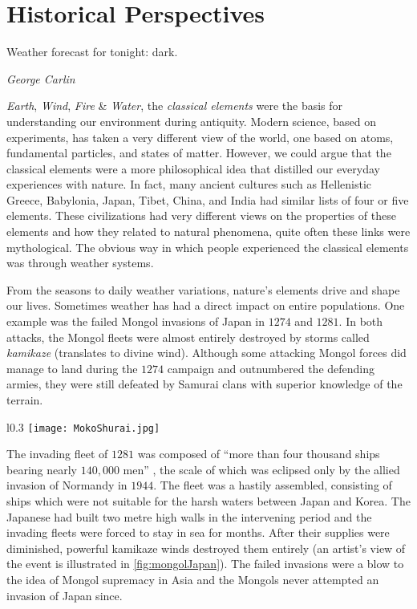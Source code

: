 \chapter{Historical Perspectives}\label{chapter:introduction}

\epigraph{Weather forecast for tonight: dark.}{\textit{George Carlin}}

\emph{Earth}, \emph{Wind}, \emph{Fire} \& \emph{Water}, the \emph{classical elements} were the 
basis for understanding our environment during antiquity. Modern science, based on experiments, has 
taken a very different view of the world, one based on atoms, fundamental particles, and states of 
matter. However, we could argue that the classical elements were a more philosophical idea that 
distilled our everyday experiences with nature. In fact, many ancient cultures such as 
Hellenistic Greece, Babylonia, Japan, Tibet, China, and India had similar lists of four or five 
elements. These civilizations had very different views on the properties of these elements and how 
they related to natural phenomena, quite often these links were mythological. The obvious way in 
which people experienced the classical elements was through weather systems. 

From the seasons to daily weather variations, nature's elements drive and shape our lives. 
Sometimes weather has had a direct impact on entire populations. One example was the failed Mongol 
invasions of Japan in $1274$ and $1281$. In both attacks, the Mongol fleets were almost entirely 
destroyed by storms called \emph{kamikaze} (translates to divine wind). Although some attacking 
Mongol forces did manage to land during the $1274$ campaign and outnumbered the defending armies, 
they were still defeated by Samurai clans with superior knowledge of the terrain. 

\begin{wrapfigure}{l}{0.3\textwidth}
    \centering\texttt{[image: MokoShurai.jpg]}
    \caption{
        {\small
            The Mongol fleet destroyed in a typhoon, 1847. \textit{Source}: Kikuchi Y\={o}sai / 
            Tokyo National Museum (Public domain)
        } 
    }\label{fig:mongolJapan}
\end{wrapfigure}

The invading fleet of $1281$ was composed of \enquote{more than four thousand ships bearing nearly 
$140,000$ men} \citep[pg.~17]{mcclain2002japan}, the scale of which was eclipsed only by the allied 
invasion of Normandy in $1944$. The fleet was a hastily assembled, consisting of ships which were 
not suitable for the harsh waters between Japan and Korea. The Japanese had built two metre high 
walls in the intervening period and the invading fleets were forced to stay in sea for months. 
After their supplies were diminished, powerful kamikaze winds destroyed them entirely (an artist's 
view of the event is illustrated in \cref{fig:mongolJapan}). The failed invasions were a blow to 
the idea of Mongol supremacy in Asia and the Mongols never attempted an invasion of Japan since.

